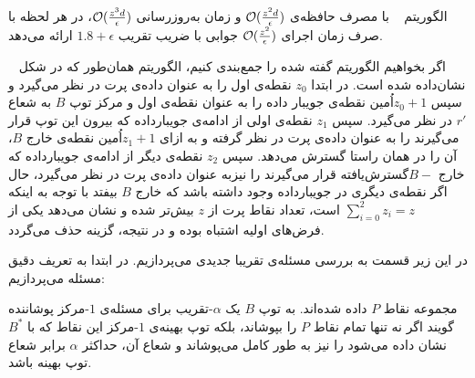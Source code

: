  الگوریتم ~ با مصرف حافظه‌ی $\mathcal{O}(\frac{z^2d}{\epsilon})$ و زمان به‌روزرسانی $\mathcal{O}(\frac{z^3d}{\epsilon})$، در هر لحظه با صرف زمان اجرای $\mathcal{O}(\frac{z^2}{\epsilon})$ جوابی با ضریب تقریب $1.8 + \epsilon$ ارائه می‌دهد.


\centering
{}
 
اگر بخواهیم الگوریتم گفته شده را جمع‌بندی کنیم، الگوریتم همان‌طور که در شکل ~ نشان‌داده شده است. در ابتدا $z_0$ نقطه‌ی اول را به عنوان داده‌ی پرت در نظر می‌گیرد و سپس $z_0 + 1$اُمین نقطه‌ی جویبار داده را به عنوان نقطه‌ی اول و مرکز‌ توپ $B$ به شعاع $r'$ در نظر می‌گیرد. سپس $z_1$ نقطه‌ی اولی از ادامه‌ی جویبارداده که بیرون این توپ قرار می‌گیرند را به عنوان داده‌ی پرت در نظر گرفته و به ازای $z_1+1$اُمین نقطه‌ی خارج $B$، آن را در همان راستا گسترش می‌دهد. سپس $z_2$ نقطه‌ی دیگر از ادامه‌ی جویبارداده که خارج $B-$گسترش‌یافته قرار می‌گیرند را نیز‌به عنوان داده‌ی پرت در نظر می‌گیرد، حال اگر نقطه‌ی دیگری در جویبارداده وجود داشته باشد که خارج $B$ بیفتد با توجه به اینکه $\sum_{i = 0}^{2} z_i = z$ است، تعداد نقاط پرت از‌ $z$ بیش‌تر شده و نشان می‌دهد یکی از فرض‌های اولیه اشتباه بوده و در نتیجه، گزینه حذف می‌گردد.


در این زیر قسمت به بررسی مسئله‌ی تقریبا جدیدی می‌پردازیم. در ابتدا به تعریف دقیق مسئله می‌پردازیم:


مجموعه نقاط $P$ داده شده‌اند. به توپ $B$ یک $\alpha$-تقریب برای مسئله‌ی $1$-مرکز‌ پوشاننده گویند اگر نه تنها تمام نقاط $P$ را بپوشاند، بلکه توپ بهینه‌ی $1$-مرکز این نقاط که با $B^*$ نشان داده می‌شود را نیز به طور کامل می‌پوشاند و شعاع آن، حداکثر $\alpha$ برابر شعاع توپ بهینه باشد. 

